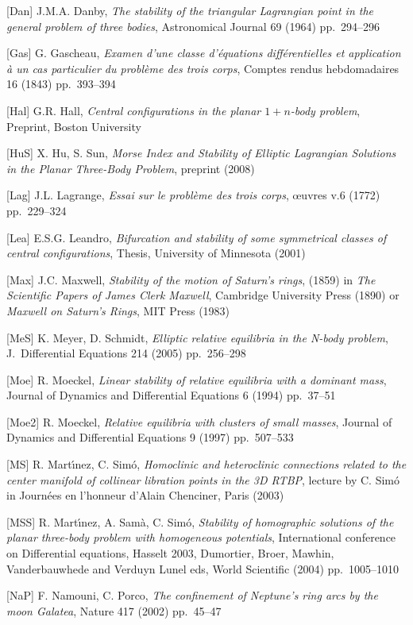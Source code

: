 \documentclass[11pt]{article}
\begin{document}
{[Dan] J.M.A. Danby, {\sl The stability of the triangular Lagrangian point in the general problem of three bodies}, Astronomical Journal 69 (1964) pp.\ 294--296

[Gas] G. Gascheau, {\sl Examen d'une classe d'\'equations diff\'erentielles et application \`a un cas particulier du probl\`eme des trois corps}, Comptes rendus hebdomadaires 16 (1843) pp.\ 393--394

[Hal] G.R. Hall, {\sl Central configurations in the planar $1+n$-body problem}, Preprint, Boston University

[HuS] X. Hu, S. Sun, {\sl Morse Index and Stability of Elliptic Lagrangian Solutions in the Planar Three-Body Problem}, preprint (2008)

[Lag] J.L. Lagrange, {\sl Essai sur le probl\`eme des trois corps}, \oe uvres v.6 (1772) pp.\ 229--324

[Lea] E.S.G. Leandro, {\sl Bifurcation and stability of some symmetrical classes of central configurations}, Thesis, University of Minnesota (2001)

[Max] J.C. Maxwell, {\sl Stability of the motion of Saturn's rings}, (1859) in {\sl The Scientific Papers of James Clerk Maxwell}, Cambridge University Press (1890) or {\sl Maxwell on Saturn's Rings}, MIT Press (1983)

[MeS] K. Meyer, D. Schmidt, {\sl Elliptic relative equilibria in the N-body problem}, J.\ Differential Equations 214 (2005) pp.\ 256--298

[Moe] R. Moeckel, {\sl Linear stability of relative equilibria with a dominant mass}, Journal of Dynamics and Differential Equations 6 (1994) pp.\ 37--51

[Moe2] R. Moeckel, {\sl Relative equilibria with clusters of small masses}, Journal of Dynamics and Differential Equations 9 (1997) pp.\ 507--533

[MS] R. Mart\'\i nez, C. Sim\'o, {\sl Homoclinic and heteroclinic connections related to the center manifold of collinear libration points in the 3D RTBP}, lecture by C. Sim\'o in Journ\'ees en l'honneur d'Alain Chenciner, Paris (2003)

[MSS] R. Mart\'\i nez, A. Sam\`a, C. Sim\'o, {\sl Stability of homographic solutions of the planar three-body problem with homogeneous potentials}, International conference on Differential equations, Hasselt 2003, Dumortier, Broer, Mawhin, Vanderbauwhede and Verduyn Lunel eds, World Scientific (2004) pp.\ 1005--1010

[NaP] F. Namouni, C. Porco, {\sl The confinement of Neptune's ring arcs by the moon Galatea}, Nature 417 (2002) pp.\ 45--47

}
\end{document}
